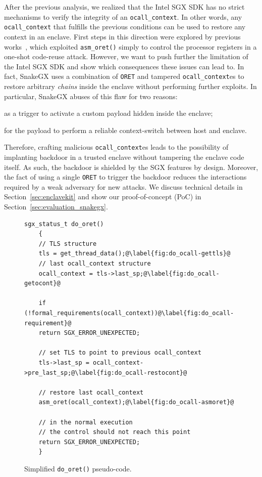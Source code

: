 After the previous analysis, we realized that the Intel SGX SDK has no strict
mechanisms to verify the integrity of an \texttt{ocall\_context}.
In other words, any \texttt{ocall\_context} that fulfills
the previous conditions can be used to restore any context in an enclave.
First steps in this direction were explored by previous 
works~\cite{biondo2018guard}, which exploited \texttt{asm\_oret()} simply to 
control the processor registers in a one-shot code-reuse attack.
However, we want to push further the limitation of the Intel SGX SDK and show 
which consequences these issues can lead to.
In fact, SnakeGX uses a combination of \texttt{ORET} and tampered 
\texttt{ocall\_context}es to restore arbitrary \emph{chains}
inside the enclave without performing further exploits.
In particular, SnakeGX abuses of this flaw for two reasons:
\begin{enumerate*}[label=(\roman*)]
	\item as a trigger to activate a custom payload hidden inside the 
	enclave;
	\item for the payload to perform a reliable context-switch between host and 
	enclave.
\end{enumerate*}
Therefore, crafting malicious \texttt{ocall\_context}es leads to the 
possibility of implanting backdoor in a trusted enclave without tampering the 
enclave code itself.
As such, the backdoor is shielded by the SGX features by design.
Moreover, the fact of using a single \texttt{ORET} to trigger the backdoor 
reduces the interactions required by a weak adversary for new attacks.
We discuss technical details in Section~\ref{sec:enclavekit} and show our 
proof-of-concept (PoC) in Section~\ref{sec:evaluation_snakegx}.

\begin{figure}[t]	
	\begin{lstlisting}[style=CStyle,escapechar=@]
	sgx_status_t do_oret()
	{
	// TLS structure
	tls = get_thread_data();@\label{fig:do_ocall-gettls}@
	// last ocall_context structure
	ocall_context = tls->last_sp;@\label{fig:do_ocall-getocont}@
	
	if (!formal_requirements(ocall_context))@\label{fig:do_ocall-requirement}@
	return SGX_ERROR_UNEXPECTED;
	
	// set TLS to point to previous ocall_context
	tls->last_sp = ocall_context->pre_last_sp;@\label{fig:do_ocall-restocont}@
	
	// restore last ocall_context
	asm_oret(ocall_context);@\label{fig:do_ocall-asmoret}@
	
	// in the normal execution
	// the control should not reach this point
	return SGX_ERROR_UNEXPECTED;
	}
	\end{lstlisting}
	\caption{Simplified \texttt{do\_oret()} pseudo-code.}
	\label{fig:do_ocall}
\end{figure}

